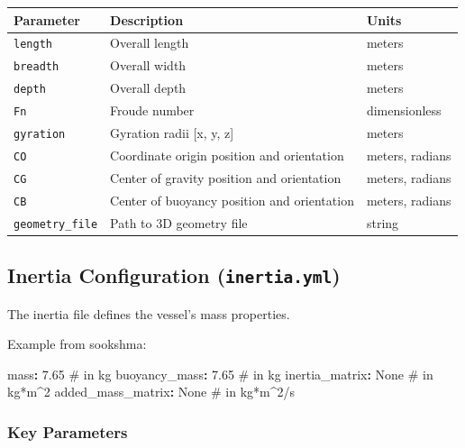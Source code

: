 \documentclass[
  letterpaper,
  DIV=11,
  numbers=noendperiod]{scrreprt}
\newenvironment{Shaded}{\begin{snugshade}}{\end{snugshade}}
\newcommand{\AttributeTok}[1]{\textcolor[rgb]{0.40,0.45,0.13}{#1}}
\newcommand{\CommentTok}[1]{\textcolor[rgb]{0.37,0.37,0.37}{#1}}
\newcommand{\FloatTok}[1]{\textcolor[rgb]{0.68,0.00,0.00}{#1}}
\newcommand{\FunctionTok}[1]{\textcolor[rgb]{0.28,0.35,0.67}{#1}}
\newcommand{\KeywordTok}[1]{\textcolor[rgb]{0.00,0.23,0.31}{\textbf{#1}}}
\begin{document}
\begin{longtable}[]{@{}lll@{}}
\toprule\noalign{}
Parameter & Description & Units \\
\midrule\noalign{}
\endhead
\bottomrule\noalign{}
\endlastfoot
\texttt{length} & Overall length & meters \\
\texttt{breadth} & Overall width & meters \\
\texttt{depth} & Overall depth & meters \\
\texttt{Fn} & Froude number & dimensionless \\
\texttt{gyration} & Gyration radii {[}x, y, z{]} & meters \\
\texttt{CO} & Coordinate origin position and orientation & meters,
radians \\
\texttt{CG} & Center of gravity position and orientation & meters,
radians \\
\texttt{CB} & Center of buoyancy position and orientation & meters,
radians \\
\texttt{geometry\_file} & Path to 3D geometry file & string \\
\end{longtable}

\subsection*{\texorpdfstring{Inertia Configuration
(\texttt{inertia.yml})}{Inertia Configuration (inertia.yml)}}\label{inertia-configuration-inertia.yml}

The inertia file defines the vessel's mass properties.

Example from sookshma:

\begin{Shaded}
\begin{Highlighting}[]
\FunctionTok{mass}\KeywordTok{:}\AttributeTok{ }\FloatTok{7.65}\CommentTok{ \# in kg}
\FunctionTok{buoyancy\_mass}\KeywordTok{:}\AttributeTok{ }\FloatTok{7.65}\CommentTok{ \# in kg}
\FunctionTok{inertia\_matrix}\KeywordTok{:}\AttributeTok{ None}\CommentTok{ \# in kg*m\^{}2}
\FunctionTok{added\_mass\_matrix}\KeywordTok{:}\AttributeTok{ None}\CommentTok{ \# in kg*m\^{}2/s}
\end{Highlighting}
\end{Shaded}

\subsubsection*{Key Parameters}\label{key-parameters-2}
\end{document}
